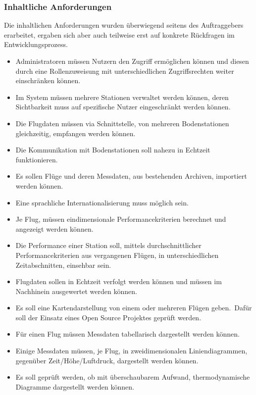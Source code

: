 \subsubsection{Inhaltliche Anforderungen}
Die inhaltlichen Anforderungen wurden überwiegend seitens des Auftraggebers erarbeitet, ergaben sich aber auch teilweise erst auf konkrete Rückfragen im Entwicklungsprozess.
\begin{itemize}
    \item Administratoren müssen Nutzern den Zugriff ermöglichen können und diesen durch eine Rollenzuweisung mit unterschiedlichen Zugriffsrechten weiter einschränken können.
    \item Im System müssen mehrere Stationen verwaltet werden können, deren Sichtbarkeit muss auf spezifische Nutzer eingeschränkt werden können.
    \item Die Flugdaten müssen via Schnittstelle, von mehreren Bodenstationen gleichzeitig, empfangen werden können.
    \item Die Kommunikation mit Bodenstationen soll nahezu in Echtzeit funktionieren.
    \item Es sollen Flüge und deren Messdaten, aus bestehenden Archiven, importiert werden können.
    \item Eine sprachliche Internationalisierung muss möglich sein.
    \item Je Flug, müssen eindimensionale Performancekriterien berechnet und angezeigt werden können.
    \item Die Performance einer Station soll, mittels durchschnittlicher Performancekriterien aus vergangenen Flügen, in unterschiedlichen Zeitabschnitten, einsehbar sein.
    \item Flugdaten sollen in Echtzeit verfolgt werden können und müssen im Nachhinein ausgewertet werden können.
    \item Es soll eine Kartendarstellung von einem oder mehreren Flügen geben.\ Dafür soll der Einsatz eines Open Source Projektes\cite{sondehub-tracker} geprüft werden.
    \item Für einen Flug müssen Messdaten tabellarisch dargestellt werden können.
    \item Einige Messdaten müssen, je Flug, in zweidimensionalen Liniendiagrammen, gegenüber Zeit/Höhe/Luftdruck, dargestellt werden können.
    \item Es soll geprüft werden, ob mit überschaubarem Aufwand, thermodynamische Diagramme dargestellt werden können.
\end{itemize}
\newpage

